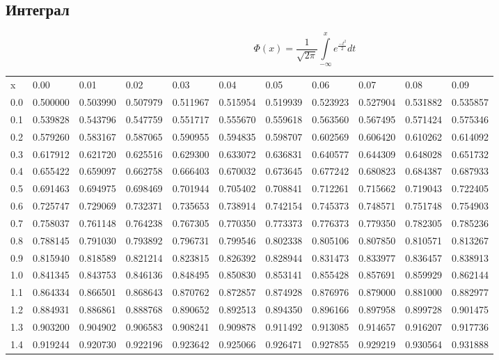 \documentclass[12pt, a4paper]{article}
\begin{document}
\subsection{Интеграл}
\begin{center}
$$ \Phi(x) = \frac{1}{\sqrt{2\pi}}\int\limits^{x}_{-\infty}{\displaystyle e^{\frac{-t^2}{2}}}dt$$
\footnotesize
\begin{tabular}{lllllllllll}
 x & 0.00&    0.01&    0.02&    0.03&    0.04&    0.05&    0.06&    0.07&    0.08&    0.09 \\
0.0& 0.500000&0.503990&0.507979&0.511967&0.515954&0.519939&0.523923&0.527904&0.531882&0.535857 \\
0.1& 0.539828&0.543796&0.547759&0.551717&0.555670&0.559618&0.563560&0.567495&0.571424&0.575346 \\
0.2& 0.579260&0.583167&0.587065&0.590955&0.594835&0.598707&0.602569&0.606420&0.610262&0.614092 \\
0.3& 0.617912&0.621720&0.625516&0.629300&0.633072&0.636831&0.640577&0.644309&0.648028&0.651732 \\
0.4& 0.655422&0.659097&0.662758&0.666403&0.670032&0.673645&0.677242&0.680823&0.684387&0.687933 \\
0.5& 0.691463&0.694975&0.698469&0.701944&0.705402&0.708841&0.712261&0.715662&0.719043&0.722405 \\
0.6& 0.725747&0.729069&0.732371&0.735653&0.738914&0.742154&0.745373&0.748571&0.751748&0.754903 \\
0.7& 0.758037&0.761148&0.764238&0.767305&0.770350&0.773373&0.776373&0.779350&0.782305&0.785236 \\
0.8& 0.788145&0.791030&0.793892&0.796731&0.799546&0.802338&0.805106&0.807850&0.810571&0.813267 \\
0.9& 0.815940&0.818589&0.821214&0.823815&0.826392&0.828944&0.831473&0.833977&0.836457&0.838913 \\
1.0& 0.841345&0.843753&0.846136&0.848495&0.850830&0.853141&0.855428&0.857691&0.859929&0.862144 \\
1.1& 0.864334&0.866501&0.868643&0.870762&0.872857&0.874928&0.876976&0.879000&0.881000&0.882977 \\
1.2& 0.884931&0.886861&0.888768&0.890652&0.892513&0.894350&0.896166&0.897958&0.899728&0.901475 \\
1.3& 0.903200&0.904902&0.906583&0.908241&0.909878&0.911492&0.913085&0.914657&0.916207&0.917736 \\
1.4& 0.919244&0.920730&0.922196&0.923642&0.925066&0.926471&0.927855&0.929219&0.930564&0.931888 \\

\end{tabular}
\end{center}
\end{document}
